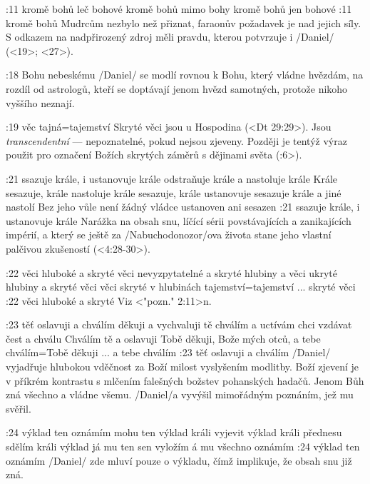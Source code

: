 :11
    {kromě bohů}  %
    {leč bohové} %
    {kromě bohů}  %
    {mimo bohy} %
    {kromě bohů}  %
    {jen bohové}  %
:11 {kromě bohů} Mudrcům nezbylo než přiznat, faraonův požadavek je nad jejich síly. S odkazem na nadpřirozený zdroj měli pravdu, kterou potvrzuje i \x/Daniel/ (<19>; <27>).



:18 {Bohu nebeskému} \x/Daniel/ se modlí rovnou k Bohu, který vládne hvězdám, na rozdíl od astrologů, kteří se doptávají jenom hvězd samotných, protože nikoho vyššího neznají.

:19 {věc tajná}={tajemství} Skryté věci jsou u Hospodina (<Dt 29:29>). Jsou {\em transcendentní} --- nepoznatelné, pokud nejsou zjeveny. Později je tentýž výraz použit pro označení Božích skrytých záměrů s dějinami světa (:6>). 

:21  
    {ssazuje krále, i ustanovuje krále}  %
    {odstraňuje krále a nastoluje krále} %
    {Krále sesazuje, krále nastoluje}  %
    {krále sesazuje, krále ustanovuje} %
    {sesazuje krále a jiné nastolí}  %
    {Bez jeho vůle není žádný vládce ustanoven ani sesazen}  %
:21 {ssazuje krále, i ustanovuje krále} Narážka na obsah snu, líčící sérii povstávajících a zanikajících impérií, a který se ještě za \x/Nabuchodonozor/ova života stane jeho vlastní palčivou zkušeností (<4:28-30>). 

:22  
    {věci hluboké a skryté}  %
    {věci nevyzpytatelné a skryté} %
    {hlubiny a věci ukryté}  %
    {hlubiny a skryté věci} %
    {věci skryté v hlubinách}  %
    {tajemství}={tajemství ... skryté věci}  %
:22 {věci hluboké a skryté} Viz <"pozn." 2:11>n. 


:23
    {těť oslavuji a chválím}  %
    {děkuji a vychvaluji tě} %
    {chválím a uctívám}  %
    {chci vzdávat čest a chválu} %
    {Chválím tě a oslavuji}  %
    {Tobě děkuji, Bože mých otců, a tebe chválím}={Tobě děkuji ... a tebe chválím}  %
:23 {těť oslavuji a chválím} \x/Daniel/ vyjadřuje hlubokou vděčnost za Boží milost vyslyšením modlitby. Boží zjevení je v příkrém kontrastu s mlčením falešných božstev pohanských hadačů. Jenom Bůh zná všechno a vládne všemu. \x/Daniel/a vyvýšil mimořádným poznáním, jež mu svěřil.

:24
    {výklad ten oznámím}  %
    {mohu ten výklad králi vyjevit}  %
    {výklad králi přednesu}  %
    {sdělím králi výklad} %
    {já mu ten sen vyložím}  %
    {á mu všechno oznámím}  %
:24 {výklad ten oznámím} \x/Daniel/ zde mluví pouze o výkladu, čímž implikuje, že obsah snu  již zná.


